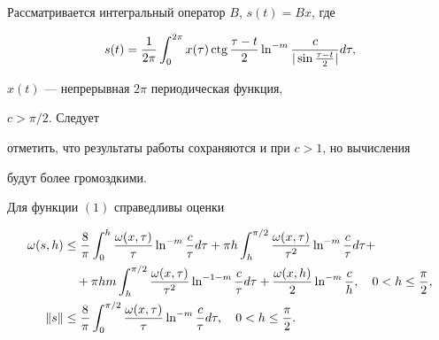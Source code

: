 \pagestyle{plain} %







\maketitle


\label{begin}








Рассматривается интегральный оператор $B$, $s(t)=B x$, где


\begin{equation}


s(t) = \frac{1}{2 \pi} \int_0^{2\pi} x(\tau) \ctg \frac{\tau-t}{2}


\ln^{-m}\frac{c}{|\sin \frac{\tau-t}{2}|} d\tau,


\end{equation}


$x(t)$ --- непрерывная $2\pi$ периодическая функция,


$c>\pi/2$. Следует


отметить, что результаты работы сохраняются и при $c>1$, но вычисления


будут более громоздкими.





\begin{thm}


Для функции $(1)$ справедливы оценки


\begin{align}


\omega(s,h) &\leq \frac{8}{\pi} \int_0^h \frac{\omega(x,\tau)}{\tau}


\ln^{-m}\frac{c}{\tau} d\tau +


\pi h \int_h^{\pi/2} \frac{\omega(x,\tau)}{\tau^2}


\ln^{-m}\frac{c}{\tau} d\tau+ \notag \\


%


&\quad +\pi hm \int_h^{\pi/2} \frac{\omega(x,\tau)}{\tau^2}


\ln^{-1-m} \frac{c}{\tau} d\tau + \frac{\omega(x,h)}{2} \ln^{-m}\frac{c}{h},


\quad 0<h \leq \frac{\pi}{2}, \\


%


\|s\| &\leq \frac{8}{\pi} \int_0^{\pi/2}


\frac{\omega(x,\tau)}{\tau} \ln^{-m}\frac{c}{\tau} d\tau,


\quad 0<h \leq \frac{\pi}{2}.


\end{align}


\end{thm}





